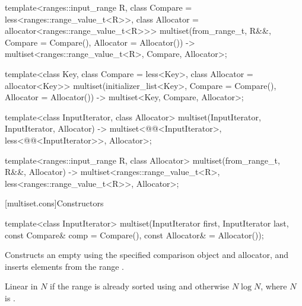 \documentclass{wg21}
\begin{document}
\begin{addedblock}
\begin{codeblock}
template<ranges::input_range R, class Compare = less<ranges::range_value_t<R>>,
    class Allocator = allocator<ranges::range_value_t<R>>>
multiset(from_range_t, R&&, Compare = Compare(), Allocator = Allocator())
-> multiset<ranges::range_value_t<R>,  Compare, Allocator>;
\end{codeblock}
\end{addedblock}
\begin{codeblock}

template<class Key, class Compare = less<Key>, class Allocator = allocator<Key>>
multiset(initializer_list<Key>, Compare = Compare(), Allocator = Allocator())
-> multiset<Key, Compare, Allocator>;

template<class InputIterator, class Allocator>
multiset(InputIterator, InputIterator, Allocator)
-> multiset<@@<InputIterator>,
    less<@@<InputIterator>>, Allocator>;

\end{codeblock}
\begin{addedblock}
\begin{codeblock}
template<ranges::input_range R,  class Allocator>
multiset(from_range_t, R&&, Allocator)
-> multiset<ranges::range_value_t<R>,  less<ranges::range_value_t<R>>, Allocator>;
\end{codeblock}
\end{addedblock}
\begin{codeblock}

template<class Key, class Allocator>
multiset(initializer_list<Key>, Allocator) -> multiset<Key, less<Key>, Allocator>;
}
\end{codeblock}%

[multiset.cons]{Constructors}

%
\begin{itemdecl}
    template<class InputIterator>
    multiset(InputIterator first, InputIterator last,
    const Compare& comp = Compare(), const Allocator& = Allocator());
\end{itemdecl}

\begin{itemdescr}
    \pnum
    \effects
    Constructs an empty
    using the specified comparison object and allocator,
    and inserts elements from the range
    .

    \pnum
    \complexity
    Linear in $N$
    if the range
    is already sorted using  and otherwise $N \log N$,
    where $N$ is
    .
\end{itemdescr}
\end{document}
